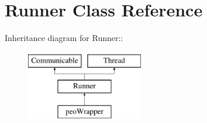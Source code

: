 \hypertarget{classRunner}{
\section{Runner Class Reference}
\label{classRunner}
}
Inheritance diagram for Runner::\begin{figure}[H]
\begin{center}
\leavevmode
\includegraphics[height=3cm]{classRunner}
\end{center}
\end{figure}
